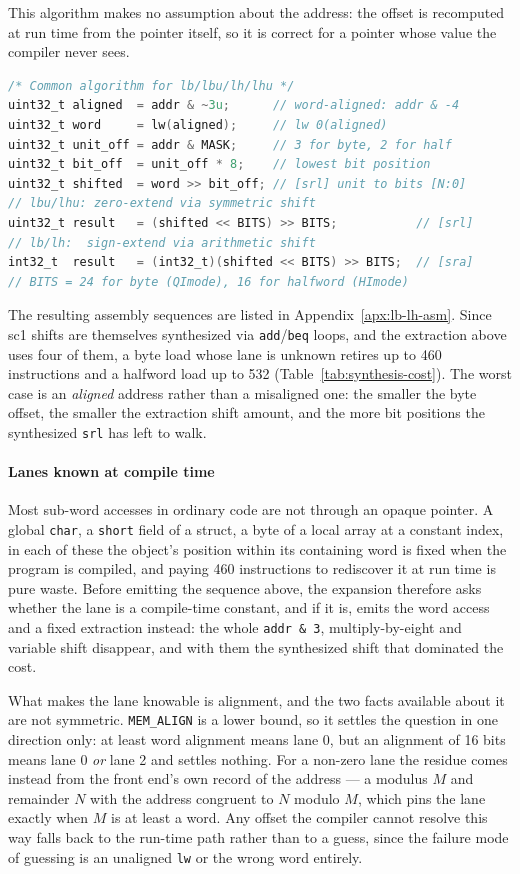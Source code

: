 This algorithm makes no assumption about the address: the offset is recomputed at run time from the
pointer itself, so it is correct for a pointer whose value the compiler never sees.

\begin{lstlisting}[language=C]
/* Common algorithm for lb/lbu/lh/lhu */
uint32_t aligned  = addr & ~3u;      // word-aligned: addr & -4
uint32_t word     = lw(aligned);     // lw 0(aligned)
uint32_t unit_off = addr & MASK;     // 3 for byte, 2 for half
uint32_t bit_off  = unit_off * 8;    // lowest bit position
uint32_t shifted  = word >> bit_off; // [srl] unit to bits [N:0]
// lbu/lhu: zero-extend via symmetric shift
uint32_t result   = (shifted << BITS) >> BITS;           // [srl]
// lb/lh:  sign-extend via arithmetic shift
int32_t  result   = (int32_t)(shifted << BITS) >> BITS;  // [sra]
// BITS = 24 for byte (QImode), 16 for halfword (HImode)
\end{lstlisting}

The resulting assembly sequences are listed in Appendix~\ref{apx:lb-lh-asm}. Since sc1 shifts are
themselves synthesized via \texttt{add}/\texttt{beq} loops, and the extraction above uses four of
them, a byte load whose lane is unknown retires up to 460 instructions and a halfword load up to 532
(Table~\ref{tab:synthesis-cost}). The worst case is an \textit{aligned} address rather than a
misaligned one: the smaller the byte offset, the smaller the extraction shift amount, and the more bit
positions the synthesized \texttt{srl} has left to walk.

\paragraph{Lanes known at compile time} \label{sec:sc1-subword-const}

Most sub-word accesses in ordinary code are not through an opaque pointer. A global \texttt{char}, a
\texttt{short} field of a struct, a byte of a local array at a constant index, in each of these the
object's position within its containing word is fixed when the program is compiled, and paying 460
instructions to rediscover it at run time is pure waste. Before emitting the sequence above, the
expansion therefore asks whether the lane is a compile-time constant, and if it is, emits the word
access and a fixed extraction instead: the whole \texttt{addr \& 3}, multiply-by-eight and variable
shift disappear, and with them the synthesized shift that dominated the cost.

What makes the lane knowable is alignment, and the two facts available about it are not symmetric.
\texttt{MEM\_ALIGN} is a lower bound, so it settles the question in one direction only: at least word
alignment means lane 0, but an alignment of 16 bits means lane 0 \textit{or} lane 2 and settles
nothing. For a non-zero lane the residue comes instead from the front end's own record of the address
--- a modulus $M$ and remainder $N$ with the address congruent to $N$ modulo $M$, which pins the
lane exactly when $M$ is at least a word. Any offset the compiler cannot resolve this way falls back
to the run-time path rather than to a guess, since the failure mode of guessing is an unaligned
\texttt{lw} or the wrong word entirely.

